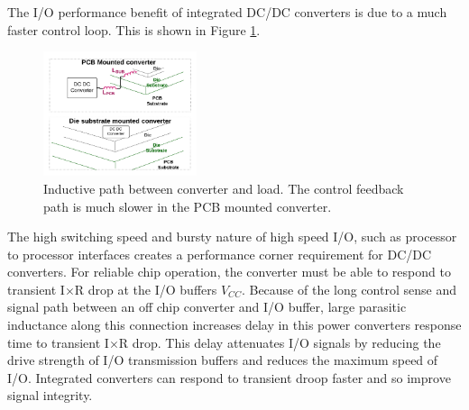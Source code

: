\documentclass[letterpaper,twocolumn,10pt]{article}
\begin{document}
%
The I/O performance benefit of integrated DC/DC converters is due to a much faster control loop. This is shown in Figure \ref{DroopTop}.\\ 
\begin{figure}[here]
\includegraphics[width=0.4\textwidth]{DroopResponseLatency}
\caption{Inductive path between converter and load. The control feedback path is much slower in the PCB mounted converter.}
\label{DroopTop}
\end{figure}
The high switching speed and bursty nature of high speed I/O, such as processor to processor interfaces creates a performance corner requirement for DC/DC converters. For reliable chip operation, the converter must be able to respond to transient I$\times$R drop at the I/O buffers $V_{CC}$. Because of the long control sense and signal path between an off chip converter and I/O buffer, large parasitic inductance along this connection increases delay in this power converters response time to transient I$\times$R drop. This delay attenuates I/O signals by reducing the drive strength of I/O transmission buffers and reduces the maximum speed of I/O. Integrated converters can respond to transient droop faster and so improve signal integrity.\\
%
\end{document}
